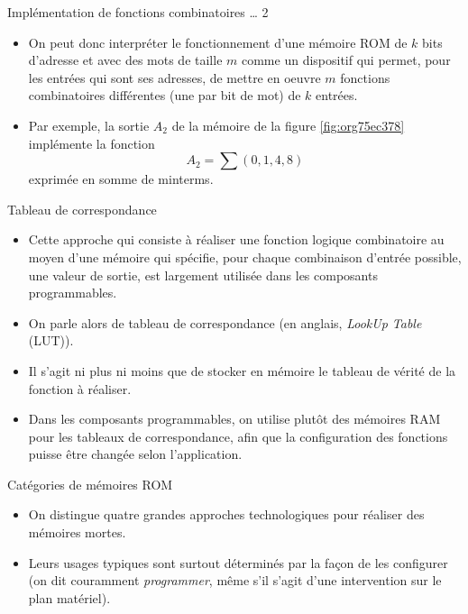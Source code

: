 \documentclass[presentation]{beamer}
\begin{document}
\begin{frame}[label={sec:org943d23b}]{Implémentation de fonctions combinatoires \ldots{} 2}
\begin{itemize}
\item On peut donc interpréter le fonctionnement d'une mémoire ROM de \(k\) bits d'adresse et avec des mots de taille \(m\) comme un dispositif qui permet, pour les entrées qui sont ses adresses, de mettre en oeuvre \(m\) fonctions combinatoires différentes (une par bit de mot) de \(k\) entrées.

\item Par exemple, la sortie \(A_2\) de la mémoire de la figure \ref{fig:org75ec378} implémente la fonction $$ A_2 = \sum (0,1,4,8) $$ exprimée en somme de minterms.
\end{itemize}
\end{frame}

\begin{frame}[label={sec:org379c43d}]{Tableau de correspondance}
\begin{itemize}
\item Cette approche qui consiste à réaliser une fonction logique combinatoire au moyen d'une mémoire qui spécifie, pour chaque combinaison d'entrée possible, une valeur de sortie, est largement utilisée dans les composants programmables.

\item On parle alors de tableau de correspondance (en anglais, \emph{LookUp Table} (LUT)).

\item Il s'agit ni plus ni moins que de stocker en mémoire le tableau de vérité de la fonction à réaliser.

\item Dans les composants programmables, on utilise plutôt des mémoires RAM pour les tableaux de correspondance, afin que la configuration des fonctions puisse être changée selon l'application.
\end{itemize}
\end{frame}

\begin{frame}[label={sec:orge893e35}]{Catégories de mémoires ROM}
\begin{itemize}
\item On distingue quatre grandes approches technologiques pour réaliser des mémoires mortes.

\item Leurs usages typiques sont surtout déterminés par la façon de les configurer (on dit couramment \emph{programmer}, même s'il s'agit d'une intervention sur le plan matériel).
\end{itemize}
\end{frame}
\end{document}
